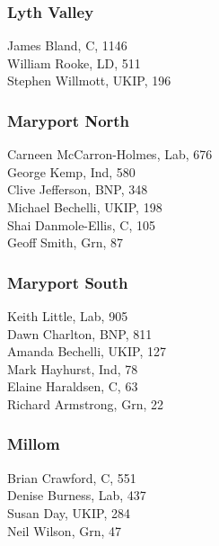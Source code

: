 \documentclass[a4paper,openany,10pt]{book}
\begin{document}
\subsubsection*{Lyth Valley}



James Bland, C, 1146\\
William Rooke, LD, 511\\
Stephen Willmott, UKIP, 196\\


\subsubsection*{Maryport North}



Carneen McCarron-Holmes, Lab, 676\\
George Kemp, Ind, 580\\
Clive Jefferson, BNP, 348\\
Michael Bechelli, UKIP, 198\\
Shai Danmole-Ellis, C, 105\\
Geoff Smith, Grn, 87\\


\subsubsection*{Maryport South}



Keith Little, Lab, 905\\
Dawn Charlton, BNP, 811\\
Amanda Bechelli, UKIP, 127\\
Mark Hayhurst, Ind, 78\\
Elaine Haraldsen, C, 63\\
Richard Armstrong, Grn, 22\\


\subsubsection*{Millom}



Brian Crawford, C, 551\\
Denise Burness, Lab, 437\\
Susan Day, UKIP, 284\\
Neil Wilson, Grn, 47\\
\end{document}
